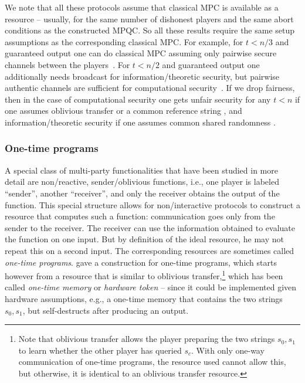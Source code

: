 We note that all these protocols assume that classical MPC is
available as a resource \--- usually, for the same
number of dishonest players and the same abort conditions as the
constructed MPQC. So all these results require the same setup
assumptions as the corresponding classical MPC. For example, for
$t < n/3$ and guaranteed output one can do classical MPC assuming only
pairwise secure channels between the players~\cite{CDN15}. For
$t < n/2$ and guaranteed output one additionally needs broadcast for
information\-/theoretic security, but pairwise authentic channels are
sufficient for computational security~\cite{CDN15}. If we drop
fairness, then in the case of computational security one gets unfair
security for any $t < n$ if one assumes oblivious transfer \cite{GMW87} or
a common reference string \cite{CLOS02}, and information\-/theoretic
security if one assumes common shared randomness \cite{IOZ14}.


\subsubsection{One-time programs}
\label{sec:mpc.OTP}

A special class of multi-party functionalities that have been studied
in more detail are non\-/reactive, sender\-/oblivious functions, i.e.,
one player is labeled ``sender'', another ``receiver'', and only the
receiver obtains the output of the function. This special structure
allows for non\-/interactive protocols to construct a resource that
computes such a function: communication goes only from the sender to
the receiver. The receiver can use the information obtained to
evaluate the function on one input. But by definition of the ideal
resource, he may not repeat this on a second input. The corresponding
resources are sometimes called \emph{one-time programs}.
\textcite{GISVW10} gave a construction for one-time programs, which
starts however from a resource that is similar to oblivious
transfer,\footnote{Note that oblivious transfer allows the player
  preparing the two strings $s_0,s_1$ to learn whether the other
  player has queried $s_c$. With only one-way communication of
  one-time programs, the resource used cannot allow this, but
  otherwise, it is identical to an oblivious transfer resource.} which
has been called \emph{one-time memory} or \emph{hardware token}
\cite{GISVW10} \--- since it could be implemented given hardware
assumptions, e.g., a one-time memory that contains the two strings
$s_0,s_1$, but self-destructs after producing an output.

